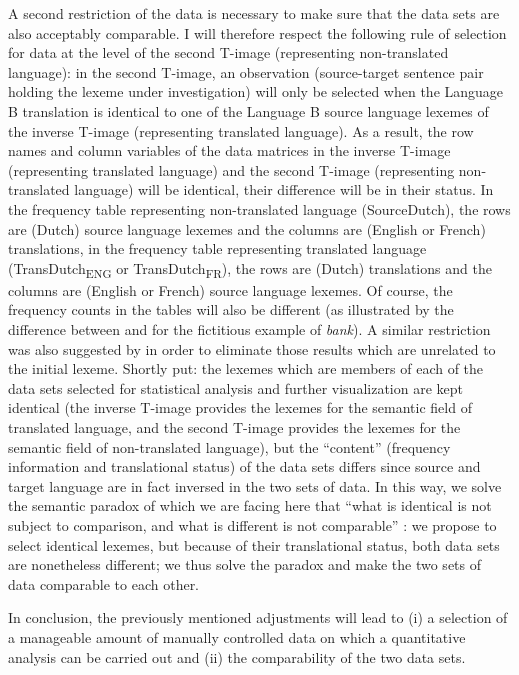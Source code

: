A second restriction of the data is necessary to make sure that the data sets are also acceptably comparable. I will therefore respect the following rule of selection for data at the level of the second T-image (representing non-translated language): in the second T-image, an observation (source-target sentence pair holding the lexeme under investigation) will only be selected when the Language B translation is identical to one of the Language B source language lexemes of the inverse T-image (representing translated language). As a result, the row names and column variables of the data matrices in the inverse T-image (representing translated language) and the second T-image (representing non-translated language) will be identical, their difference will be in their status. In the frequency table representing non-translated language (SourceDutch), the rows are (Dutch) source language lexemes and the columns are (English or French) translations, in the frequency table representing translated language (TransDutch\textsubscript{ENG} or TransDutch\textsubscript{FR}), the rows are (Dutch) translations and the columns are (English or French) source language lexemes. Of course, the frequency counts in the tables will also be different (as illustrated by the difference between  and  for the fictitious example of \textit{bank}). A similar restriction was also suggested by \citet[60]{johansson_translational_1998} in order to eliminate those results which are unrelated to the initial lexeme. Shortly put: the lexemes which are members of each of the data sets selected for statistical analysis and further visualization are kept identical (the inverse T-image provides the lexemes for the semantic field of translated language, and the second T-image provides the lexemes for the semantic field of non-translated language), but the ``content'' (frequency information and translational status) of the data sets differs since source and target language are in fact inversed in the two sets of data. In this way, we solve the semantic paradox of \citet{krzeszowski_contrasting_1990} which we are facing here that “what is identical is not subject to comparison, and what is different is not comparable” \citep[7]{krzeszowski_contrasting_1990}: we propose to select identical lexemes, but because of their translational status, both data sets are nonetheless different; we thus solve the paradox and make the two sets of data comparable to each other.

In conclusion, the previously mentioned adjustments will lead to (i) a selection of a manageable amount of manually controlled data on which a quantitative analysis can be carried out and (ii) the comparability of the two data sets.

